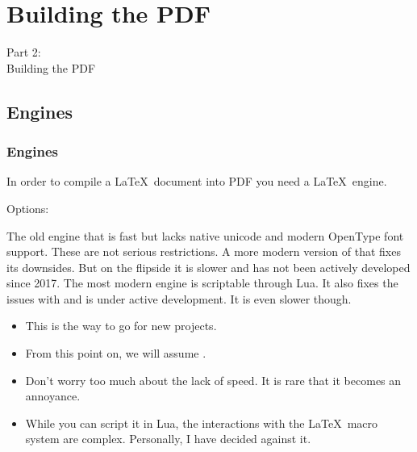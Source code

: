 
{
\renewcommand{\bgcolor}{building}

\section{Building the PDF}
\begin{frame}
  \vspace{25mm}
  \begin{center}
    \Huge{Part 2:\\Building the PDF}
  \end{center}
\end{frame}

\subsection{Engines}
\begin{frame}[fragile]
  \frametitle{Engines}
  \vspace{2mm}
  In order to compile a \LaTeX\ document into PDF you need a \LaTeX\ engine.
  
  \vspace{4mm}
  Options:
  \begin{itemize}
     The old engine that is fast but lacks native unicode and modern OpenType font support. These are not serious restrictions.
     A more modern version of  that fixes its downsides. But on the flipside it is slower and has not been actively developed since 2017.
     The most modern engine is scriptable through Lua. It also fixes the issues with  and is under active development. It is even slower though.
      \begin{itemize}
        \item This is the way to go for new projects.
        \item From this point on, we will assume .
        \item Don't worry too much about the lack of speed. It is rare that it becomes an annoyance.
        \item While you can script it in Lua, the interactions with the \LaTeX\ macro system are complex. Personally, I have decided against it.
      \end{itemize}
  \end{itemize}
\end{frame}

}
